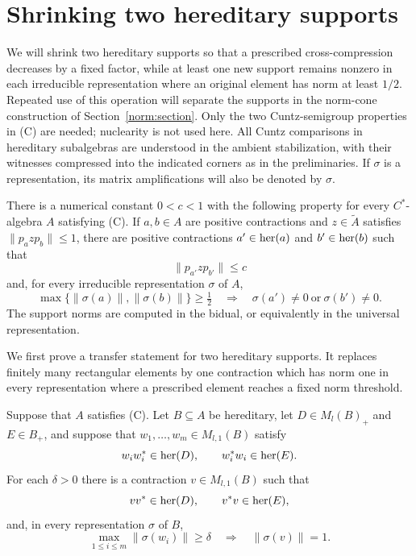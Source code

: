 \section{Shrinking two hereditary supports}
\label{shr:section}

We will shrink two hereditary supports so that a prescribed
cross-compression decreases by a fixed factor, while at least one new
support remains nonzero in each irreducible representation where an
original element has norm at least $1/2$.  Repeated use of this operation
will separate the supports
in the norm-cone construction of Section~\ref{norm:section}.
Only the two Cuntz-semigroup properties in \textup{(C)} are needed;
nuclearity is not used here.  All
Cuntz comparisons in hereditary subalgebras are understood in the ambient
stabilization, with their witnesses compressed into the indicated corners
as in the preliminaries.  If $\sigma$ is a representation, its matrix
amplifications will also be denoted by $\sigma$.

\begin{lemma}\label{lem:shrinking}
There is a numerical constant $0<c<1$ with the following property for
every $C^*$-algebra $A$ satisfying \textup{(C)}.  If $a,b\in A$ are positive
contractions and $z\in\widetilde A$ satisfies
$\|p_a z p_b\|\le1$, there are positive contractions
$a'\in\operatorname{her}(a)$ and $b'\in\operatorname{her}(b)$ such that
\begin{equation}\label{shr:conclusion}
 \|p_{a'}z p_{b'}\|\le c
\end{equation}
and, for every irreducible representation $\sigma$ of $A$,
\begin{equation}\label{shr:visibility}
 \max\{\|\sigma(a)\|,\|\sigma(b)\|\}\ge\tfrac12
 \quad\Longrightarrow\quad
 \sigma(a')\ne0\ \text{or}\ \sigma(b')\ne0.
\end{equation}
The support norms are computed in the bidual, or equivalently in the
universal representation.
\end{lemma}

We first prove a transfer statement for two hereditary supports.  It
replaces finitely many rectangular elements by one contraction which
has norm one in every representation where a prescribed element reaches
a fixed norm threshold.

\begin{lemma}\label{lem:transfer}
Suppose that $A$ satisfies \textup{(C)}.  Let $B\subseteq A$ be hereditary,
let $D\in M_l(B)_+$ and $E\in B_+$, and suppose that
$w_1,\ldots,w_m\in M_{l,1}(B)$ satisfy
\[
 w_iw_i^*\in\operatorname{her}(D),\qquad w_i^*w_i\in\operatorname{her}(E).
\]
For each $\delta>0$ there is a contraction $v\in M_{l,1}(B)$ such that
\[
 vv^*\in\operatorname{her}(D),\qquad v^*v\in\operatorname{her}(E),
\]
and, in every representation $\sigma$ of $B$,
\[
 \max_{1\le i\le m}\|\sigma(w_i)\|\ge\delta
 \quad\Longrightarrow\quad \|\sigma(v)\|=1.
\]
\end{lemma}

